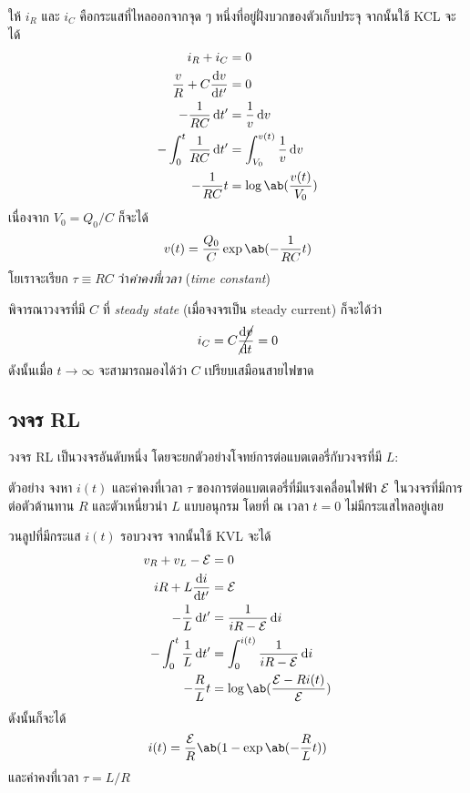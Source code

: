 \begin{soln}
    ให้ $i_R$ และ $i_C$ คือกระแสที่ไหลออกจากจุด ๆ หนึ่งที่อยู่ฝั่งบวกของตัวเก็บประจุ จากนั้นใช้ KCL จะได้
    \begin{align*}
        i_R + i_C &= 0\\
        \frac{v}{R} + C\odv{v}{t'} &= 0\\
        -\frac{1}{RC}\odif{t'} &= \frac{1}{v} \odif{v}\\
        -\int_0^t \frac{1}{RC}\odif{t'} &= \int_{V_0}^{v(t)} \frac{1}{v} \odif{v}\\
        -\frac{1}{RC}t &= \log\ab(\frac{v(t)}{V_0})
    \end{align*}
    เนื่องจาก $V_0 = Q_0 / C$ ก็จะได้
    \[
    v(t) = \frac{Q_0}{C}\exp\ab(-\frac{1}{RC}t)
    \]
    โยเราจะเรียก $\tau \equiv RC$ ว่า\emph{ค่าคงที่เวลา} (\emph{time constant})
\end{soln}

พิจารณาวงจรที่มี $C$ ที่ \emph{steady state} (เมื่อจงจรเป็น steady current) ก็จะได้ว่า
\[
i_C = C\cancel{\odv{v}{t}} = 0 
\]
ดังนั้นเมื่อ $t\to\infty$ จะสามารถมองได้ว่า $C$ เปรียบเสมือนสายไฟขาด

\subsection{วงจร RL}

วงจร RL เป็นวงจรอันดับหนึ่ง โดยจะยกตัวอย่างโจทย์การต่อแบตเตอรี่กับวงจรที่มี $L$:

\begin{corbox}{ตัวอย่าง}
    จงหา $i(t)$ และค่าคงที่เวลา $\tau$ ของการต่อแบตเตอรี่ที่มีแรงเคลื่อนไฟฟ้า $\mathcal{E}$ ในวงจรที่มีการต่อตัวต้านทาน $R$ และตัวเหนี่ยวนำ $L$ แบบอนุกรม โดยที่ ณ เวลา $t = 0$ ไม่มีกระแสไหลอยู่เลย
\end{corbox}

\begin{soln}
    วนลูปที่มีกระแส $i(t)$ รอบวงจร จากนั้นใช้ KVL จะได้
    \begin{align*}
        v_R + v_L - \emf &= 0\\
        iR + L\odv{i}{t'} &= \emf\\
        -\frac{1}{L} \odif{t'} &= \frac{1}{iR-\emf} \odif{i}\\
        -\int_0^t \frac{1}{L} \odif{t'} &= \int_0^{i(t)} \frac{1}{iR-\emf}\odif{i}\\
        -\frac{R}{L}t &= \log\ab(\frac{\emf - Ri(t)}{\emf})
    \end{align*}
    ดังนั้นก็จะได้
    \[
    i(t) = \frac{\emf}{R}\ab(1-\exp\ab(-\frac{R}{L}t))
    \]
    และค่าคงที่เวลา $\tau = L / R$
\end{soln}

